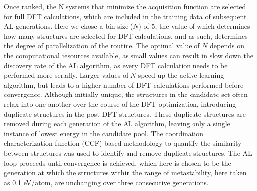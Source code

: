 %
Once ranked, the N systems that minimize the acquisition function are selected for full DFT calculations, which are included in the training data of subsequent AL generations.
%
Here we chose a bin size ($N$) of \num{5}, the value of which determines how many structures are selected for DFT calculations,
and as such, determines the degree of parallelization of the routine.
%
The optimal value of $N$ depends on the computational resources available, as small values can result in slow down the discovery rate of the AL algorithm,
as every DFT calculation needs to be performed more serially.
%
Larger values of $N$ speed up the active-learning algorithm, but leads to a higher number of DFT calculations performed before convergence.
%
Although initially unique, the structures in the candidate set often relax into one another over the course of the DFT optimization, introducing duplicate structures in the post-DFT structures.
%
These duplicate structures are removed during each generation of the AL algorithm, leaving only a single instance of lowest energy in the candidate pool.
%
The coordination characterization function (CCF) based methodology to quantify the similarity between structures was used to identify and remove duplicate structures.\cite{Su2017}
%
The AL loop proceeds until convergence is achieved, which here is chosen to be the generation at which the structures within the range of metastability, here taken as \num{0.1} eV/atom, are unchanging over three consecutive generations.


